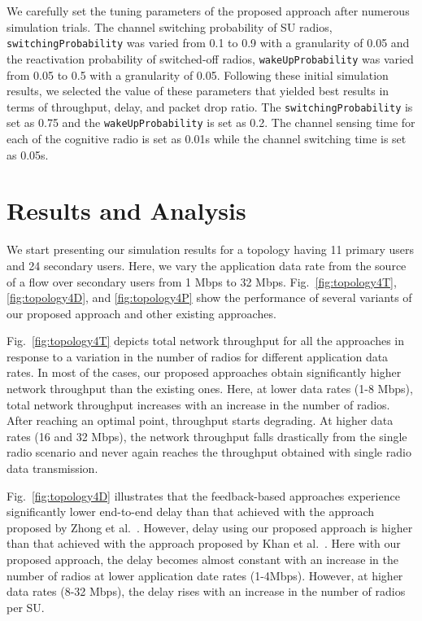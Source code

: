 We carefully set the tuning parameters of the proposed approach after numerous simulation trials. The channel switching probability of SU radios, \texttt{switchingProbability} was varied from 0.1 to 0.9 with a granularity of 0.05 and the reactivation probability of switched-off radios, \texttt{wakeUpProbability} was varied from 0.05 to 0.5 with a granularity of 0.05. Following these initial simulation results, we selected the value of these parameters that yielded best results in terms of throughput, delay, and packet drop ratio. The \texttt{switchingProbability} is set as 0.75 and the \texttt{wakeUpProbability} is set as 0.2. The channel sensing time for each of the cognitive radio is set as 0.01s while the channel switching time is set as 0.05s.

\section{Results and Analysis}

We start presenting our simulation results for a topology having 11 primary users and 24 secondary users. Here, we vary the application data rate from the source of a flow over secondary users from 1 Mbps to 32 Mbps. Fig.~\ref{fig:topology4T}, \ref{fig:topology4D}, and \ref{fig:topology4P} show the performance of several variants of our proposed approach and other existing approaches.






Fig.~\ref{fig:topology4T} depicts total network throughput for all the approaches in response to a variation in the number of radios for different application data rates. In most of the cases, our proposed approaches obtain significantly higher network throughput than the existing ones. Here, at lower data rates (1-8 Mbps), total network throughput increases with an increase in the number of radios. After reaching an optimal point, throughput starts degrading. At higher data rates (16 and 32 Mbps), the network throughput falls drastically from the single radio scenario and never again reaches the throughput obtained with single radio data transmission.

Fig.~\ref{fig:topology4D} illustrates that the feedback-based approaches experience significantly lower end-to-end delay than that achieved with the approach proposed by Zhong et al.~\cite{zhong2014capacity}. However, delay using our proposed approach is higher than that achieved with the approach proposed by Khan et al.~\cite{khan2015towards}. Here with our proposed approach, the delay becomes almost constant with an increase in the number of radios at lower application date rates (1-4Mbps). However, at higher data rates (8-32 Mbps), the delay rises with an increase in the number of radios per SU.

